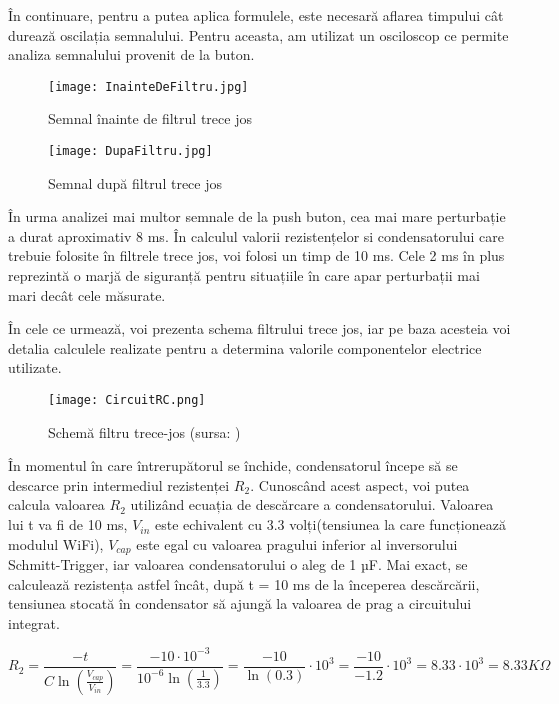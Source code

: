 \vspace{1em}
	În continuare, pentru a putea aplica formulele, este necesară aflarea timpului cât durează oscilația semnalului. Pentru aceasta, am utilizat un osciloscop ce permite analiza semnalului provenit de la buton.

\begin{figure}[H]
	\centering
    	\texttt{[image: InainteDeFiltru.jpg]}
	\caption{Semnal înainte de filtrul trece jos}
	\label{fig:InainteDeFiltru}
\end{figure}

\begin{figure}[H]
   	\centering
    	\texttt{[image: DupaFiltru.jpg]}
	\caption{Semnal după filtrul trece jos}
	\label{fig:DupaFiltru}
\end{figure}
	
	În urma analizei mai multor semnale de la push buton, cea mai mare perturbație a durat aproximativ 8 ms. În calculul valorii rezistențelor si condensatorului care trebuie folosite în filtrele trece jos, voi folosi un timp de 10 ms. Cele 2 ms în plus reprezintă o marjă de siguranță pentru situațiile în care apar perturbații mai mari decât cele măsurate. 

\vspace{1em}

	În cele ce urmează, voi prezenta schema filtrului trece jos, iar pe baza acesteia voi detalia calculele realizate pentru a determina valorile componentelor electrice utilizate.

\begin{figure}[H]
   	\centering
    	\texttt{[image: CircuitRC.png]}
	\caption{Schemă filtru trece-jos (sursa: \cite{buttonDebouncing})}
\end{figure}

	În momentul în care întrerupătorul se închide, condensatorul începe să se descarce prin intermediul rezistenței $R_2$. Cunoscând acest aspect, voi putea calcula valoarea $R_2$ utilizând ecuația de descărcare a condensatorului. Valoarea lui t va fi de 10 ms, $V_{in}$ este echivalent cu 3.3 volți(tensiunea la care funcționează modulul WiFi), $V_{cap}$ este egal cu valoarea pragului inferior al inversorului Schmitt-Trigger, iar valoarea condensatorului o aleg de 1 µF. Mai exact, se calculează rezistența astfel încât, după t = 10 ms de la începerea descărcării, tensiunea stocată în condensator să ajungă la valoarea de prag a circuitului integrat.

\[
	R_2 = \frac{-t}{C\ln(\frac{V_{cap}}{V_{in}})} = \frac{-10 \cdot 10^{-3}}{10^{-6}\ln(\frac{1}{3.3})} = \frac{-10}{\ln(0.3)}\cdot 10^3 =  \frac{-10}{-1.2}\cdot 10^3 = 8.33 \cdot 10^3 = 8.33 K\Omega
\]

